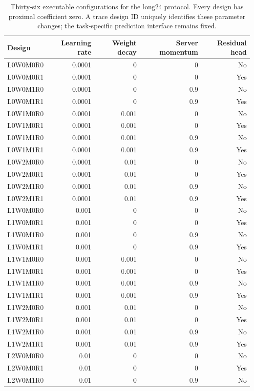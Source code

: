 \begin{table}[htbp]
\caption{Thirty-six executable configurations for the long24 protocol. Every design has proximal coefficient zero. A trace design ID uniquely identifies these parameter changes; the task-specific prediction interface remains fixed.}
\label{tab:completed-menu-long24}
\centering\small
\setlength{\tabcolsep}{4pt}
\begin{tabularx}{\linewidth}{@{}Xrrrr@{}}
\toprule
Design & Learning rate & Weight decay & Server momentum & Residual head \\
\midrule
L0W0M0R0 & 0.0001 & 0 & 0 & No \\
L0W0M0R1 & 0.0001 & 0 & 0 & Yes \\
L0W0M1R0 & 0.0001 & 0 & 0.9 & No \\
L0W0M1R1 & 0.0001 & 0 & 0.9 & Yes \\
L0W1M0R0 & 0.0001 & 0.001 & 0 & No \\
L0W1M0R1 & 0.0001 & 0.001 & 0 & Yes \\
L0W1M1R0 & 0.0001 & 0.001 & 0.9 & No \\
L0W1M1R1 & 0.0001 & 0.001 & 0.9 & Yes \\
L0W2M0R0 & 0.0001 & 0.01 & 0 & No \\
L0W2M0R1 & 0.0001 & 0.01 & 0 & Yes \\
L0W2M1R0 & 0.0001 & 0.01 & 0.9 & No \\
L0W2M1R1 & 0.0001 & 0.01 & 0.9 & Yes \\
L1W0M0R0 & 0.001 & 0 & 0 & No \\
L1W0M0R1 & 0.001 & 0 & 0 & Yes \\
L1W0M1R0 & 0.001 & 0 & 0.9 & No \\
L1W0M1R1 & 0.001 & 0 & 0.9 & Yes \\
L1W1M0R0 & 0.001 & 0.001 & 0 & No \\
L1W1M0R1 & 0.001 & 0.001 & 0 & Yes \\
L1W1M1R0 & 0.001 & 0.001 & 0.9 & No \\
L1W1M1R1 & 0.001 & 0.001 & 0.9 & Yes \\
L1W2M0R0 & 0.001 & 0.01 & 0 & No \\
L1W2M0R1 & 0.001 & 0.01 & 0 & Yes \\
L1W2M1R0 & 0.001 & 0.01 & 0.9 & No \\
L1W2M1R1 & 0.001 & 0.01 & 0.9 & Yes \\
L2W0M0R0 & 0.01 & 0 & 0 & No \\
L2W0M0R1 & 0.01 & 0 & 0 & Yes \\
L2W0M1R0 & 0.01 & 0 & 0.9 & No \\

\end{tabularx}
\end{table}
